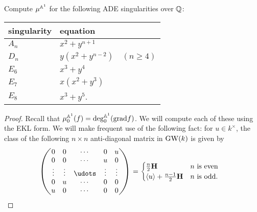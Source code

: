 \documentclass[english]{article}
\begin{document}
\setcounter{subsection}{3}
\setcounter{theorem}{2}
\begin{exercise} Compute $\mu^{\mathbb{A}^1}$ for the following ADE singularities over $\mathbb{Q}$:
\begin{center}
	\begin{tabular}{l | l}
	singularity & equation \\
	\hline
	$A_n$	&	$x^2 + y^{n+1}$ \\
	$D_n$	&	$y(x^2 + y^{n-2}) \quad (n\geq 4)$ \\
	$E_6$	&	$x^3 + y^4$ \\
	$E_7$	&	$x ( x^2 + y^3 )$ \\
	$E_8$	&	$x^3 + y^5$.
    \end{tabular}
\end{center}
\end{exercise}
\begin{proof} Recall that $\mu_0^{\mathbb{A}^1}(f) = \deg_0^{\mathbb{A}^1}(\text{grad} f)$. We will compute each of these using the EKL form. We will make frequent use of the following fact: for $u \in k^\times$, the class of the following $n\times n$ anti-diagonal matrix in $\text{GW}(k)$ is given by
\begin{align*}
    \begin{pmatrix} 0 & 0 & \cdots & 0 & u \\
    0 & 0 & \cdots & u & 0 \\
    \vdots & \vdots & \udots & \vdots & \vdots \\
    0 & u & \cdots & 0 & 0 \\
    u & 0 & \cdots & 0 & 0\end{pmatrix} &= \begin{cases} \frac{n}{2}\H & n\text{ is even} \\ \left\langle u \right\rangle + \frac{n-1}{2}\H & n\text{ is odd}. \end{cases}
\end{align*}


\end{proof}
\end{document}
